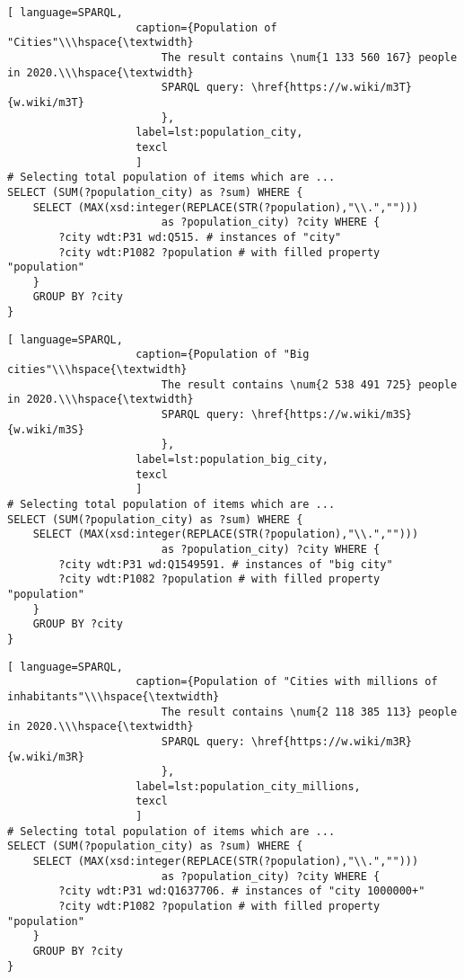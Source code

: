 \begin{lstlisting}[ language=SPARQL, 
                    caption={Population of "Cities"\\\hspace{\textwidth}
                        The result contains \num{1 133 560 167} people in 2020.\\\hspace{\textwidth}
                        SPARQL query: \href{https://w.wiki/m3T}{w.wiki/m3T}
                        },
                    label=lst:population_city,
                    texcl 
                    ]
# Selecting total population of items which are ...
SELECT (SUM(?population_city) as ?sum) WHERE {                    
	SELECT (MAX(xsd:integer(REPLACE(STR(?population),"\\.",""))) 
						as ?population_city) ?city WHERE {
		?city wdt:P31 wd:Q515. # instances of "city"
		?city wdt:P1082 ?population # with filled property "population"
	}
	GROUP BY ?city
}
\end{lstlisting}%

\begin{lstlisting}[ language=SPARQL, 
                    caption={Population of "Big cities"\\\hspace{\textwidth}
                        The result contains \num{2 538 491 725} people in 2020.\\\hspace{\textwidth}
                        SPARQL query: \href{https://w.wiki/m3S}{w.wiki/m3S}
                        },
                    label=lst:population_big_city,
                    texcl 
                    ]
# Selecting total population of items which are ...
SELECT (SUM(?population_city) as ?sum) WHERE {                    
	SELECT (MAX(xsd:integer(REPLACE(STR(?population),"\\.",""))) 
						as ?population_city) ?city WHERE {
		?city wdt:P31 wd:Q1549591. # instances of "big city"
		?city wdt:P1082 ?population # with filled property "population"
	}
	GROUP BY ?city
}
\end{lstlisting}%

\begin{lstlisting}[ language=SPARQL, 
                    caption={Population of "Cities with millions of inhabitants"\\\hspace{\textwidth}
                        The result contains \num{2 118 385 113} people in 2020.\\\hspace{\textwidth}
                        SPARQL query: \href{https://w.wiki/m3R}{w.wiki/m3R}
                        },
                    label=lst:population_city_millions,
                    texcl 
                    ]
# Selecting total population of items which are ...
SELECT (SUM(?population_city) as ?sum) WHERE {
	SELECT (MAX(xsd:integer(REPLACE(STR(?population),"\\.",""))) 
						as ?population_city) ?city WHERE {
		?city wdt:P31 wd:Q1637706. # instances of "city 1000000+"
		?city wdt:P1082 ?population # with filled property "population"
	}
	GROUP BY ?city
}
\end{lstlisting}%

